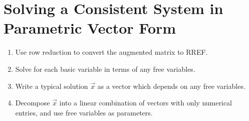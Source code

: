 \documentclass[letterpaper,12pt]{article}
\begin{document}
\section*{Solving a Consistent System in Parametric Vector Form}
\begin{enumerate}
    \item Use row reduction to convert the augmented matrix to RREF.
    \item Solve for each basic variable in terms of any free variables.
    \item Write a typical solution $\vec{x}$ as a vector which depends on any free variables.
    \item Decompose $\vec{x}$ into a linear combination of vectors with only numerical entries, and use free variables as parameters.
\end{enumerate}
\end{document}
